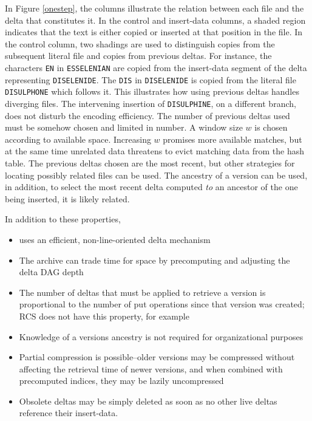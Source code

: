 \documentclass{llncs}
\begin{document}

In Figure \ref{onestep}, the columns illustrate the relation between
each file and the delta that constitutes it.  In the control and
insert-data columns, a shaded region indicates that the text is either
copied or inserted at that position in the file.  In the control
column, two shadings are used to distinguish copies from the
subsequent literal file and copies from previous deltas.  For
instance, the characters \texttt{EN} in \texttt{ESSELENIAN} are copied
from the insert-data segment of the delta representing
\texttt{DISELENIDE}.  The \texttt{DIS} in \texttt{DISELENIDE} is
copied from the literal file \texttt{DISULPHONE} which follows it.
This illustrates how using previous deltas handles diverging files.
The intervening insertion of \texttt{DISULPHINE}, on a different
branch, does not disturb the encoding efficiency.  The number of
previous deltas used must be somehow chosen and limited in number.  A
window size $w$ is chosen according to available space.  Increasing
$w$ promises more available matches, but at the same time unrelated
data threatens to evict matching data from the hash table.  The
previous deltas chosen are the most recent, but other strategies for
locating possibly related files can be used.  The ancestry of a
version can be used, in addition, to select the most recent delta
computed \emph{to} an ancestor of the one being inserted, it is likely
related.

In addition to these properties,

\begin{itemize}
\item \xd {} uses an efficient, non-line-oriented delta mechanism
\item The archive can trade time for space by precomputing and
adjusting the delta DAG depth
\item The number of deltas that must be applied to retrieve a version
is proportional to the number of put operations since that version was
created; RCS does not have this property, for example
\item Knowledge of a versions ancestry is not required for
organizational purposes
\item Partial compression is possible--older versions may be
compressed without affecting the retrieval time of newer versions, and
when combined with precomputed indices, they may be lazily
uncompressed
\item Obsolete deltas may be simply deleted as soon as no other live
deltas reference their insert-data.
\end{itemize}
\end{document}
